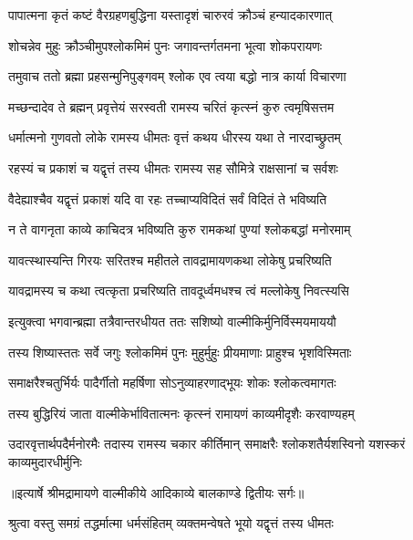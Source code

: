 \twolineshloka
{पापात्मना कृतं कष्टं वैरग्रहणबुद्धिना}
{यस्तादृशं चारुरवं क्रौञ्चं हन्यादकारणात्} %

\twolineshloka
{शोचन्नेव मुहुः क्रौञ्चीमुपश्लोकमिमं पुनः}
{जगावन्तर्गतमना भूत्वा शोकपरायणः} %

\twolineshloka
{तमुवाच ततो ब्रह्मा प्रहसन्मुनिपुङ्गवम्}
{श्लोक एव त्वया बद्धो नात्र कार्या विचारणा} %

\twolineshloka
{मच्छन्दादेव ते ब्रह्मन् प्रवृत्तेयं सरस्वती}
{रामस्य चरितं कृत्स्नं कुरु त्वमृषिसत्तम} %

\twolineshloka
{धर्मात्मनो गुणवतो लोके रामस्य धीमतः}
{वृत्तं कथय धीरस्य यथा ते नारदाच्छ्रुतम्} %

\twolineshloka
{रहस्यं च प्रकाशं च यद्वृत्तं तस्य धीमतः}
{रामस्य सह सौमित्रे राक्षसानां च सर्वशः} %

\twolineshloka
{वैदेह्याश्चैव यद्वृत्तं प्रकाशं यदि वा रहः}
{तच्चाप्यविदितं सर्वं विदितं ते भविष्यति} %

\twolineshloka
{न ते वागनृता काव्ये काचिदत्र भविष्यति}
{कुरु रामकथां पुण्यां श्लोकबद्धां मनोरमाम्} %

\twolineshloka
{यावत्स्थास्यन्ति गिरयः सरितश्च महीतले}
{तावद्रामायणकथा लोकेषु प्रचरिष्यति} %

\twolineshloka
{यावद्रामस्य च कथा त्वत्कृता प्रचरिष्यति}
{तावदूर्ध्वमधश्च त्वं मल्लोकेषु निवत्स्यसि} %

\twolineshloka
{इत्युक्त्वा भगवान्ब्रह्मा तत्रैवान्तरधीयत}
{ततः सशिष्यो वाल्मीकिर्मुनिर्विस्मयमाययौ} %

\twolineshloka
{तस्य शिष्यास्ततः सर्वे जगुः श्लोकमिमं पुनः}
{मुहुर्मुहुः प्रीयमाणाः प्राहुश्च भृशविस्मिताः} %

\twolineshloka
{समाक्षरैश्चतुर्भिर्यः पादैर्गीतो महर्षिणा}
{सोऽनुव्याहरणाद्भूयः शोकः श्लोकत्वमागतः} %

\twolineshloka
{तस्य बुद्धिरियं जाता वाल्मीकेर्भावितात्मनः}
{कृत्स्नं रामायणं काव्यमीदृशैः करवाण्यहम्} %

\fourlineindentedshloka
{उदारवृत्तार्थपदैर्मनोरमैः}
{तदास्य रामस्य चकार कीर्तिमान्}
{समाक्षरैः श्लोकशतैर्यशस्विनो}
{यशस्करं काव्यमुदारधीर्मुनिः} %


{॥इत्यार्षे श्रीमद्रामायणे वाल्मीकीये आदिकाव्ये बालकाण्डे द्वितीयः सर्गः॥}


\twolineshloka
{श्रुत्वा वस्तु समग्रं तद्धर्मात्मा धर्मसंहितम्}
{व्यक्तमन्वेषते भूयो यद्वृत्तं तस्य धीमतः} %

